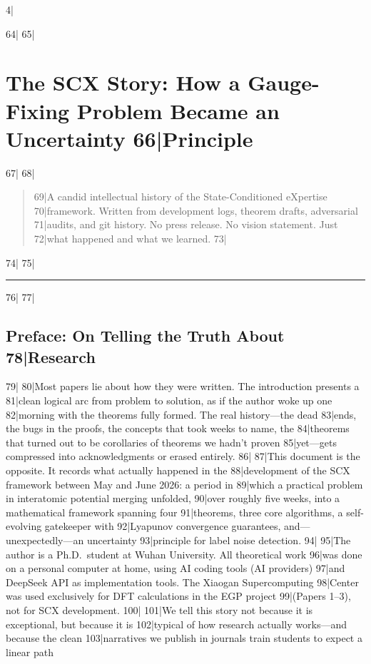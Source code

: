 4|\documentclass[
5|  12pt,
6|]{ctexart}
\begin{document}
64|
65|\section{The SCX Story: How a Gauge-Fixing Problem Became an Uncertainty
66|Principle}\label{the-scx-story-how-a-gauge-fixing-problem-became-an-uncertainty-principle}
67|
68|\begin{quote}
69|A candid intellectual history of the State-Conditioned eXpertise
70|framework. Written from development logs, theorem drafts, adversarial
71|audits, and git history. No press release. No vision statement. Just
72|what happened and what we learned.
73|\end{quote}
74|
75|\begin{center}\rule{0.5\linewidth}{0.5pt}\end{center}
76|
77|\subsection{Preface: On Telling the Truth About
78|Research}\label{preface-on-telling-the-truth-about-research}
79|
80|Most papers lie about how they were written. The introduction presents a
81|clean logical arc from problem to solution, as if the author woke up one
82|morning with the theorems fully formed. The real history---the dead
83|ends, the bugs in the proofs, the concepts that took weeks to name, the
84|theorems that turned out to be corollaries of theorems we hadn't proven
85|yet---gets compressed into acknowledgments or erased entirely.
86|
87|This document is the opposite. It records what actually happened in the
88|development of the SCX framework between May and June 2026: a period in
89|which a practical problem in interatomic potential merging unfolded,
90|over roughly five weeks, into a mathematical framework spanning four
91|theorems, three core algorithms, a self-evolving gatekeeper with
92|Lyapunov convergence guarantees, and---unexpectedly---an uncertainty
93|principle for label noise detection.
94|
95|The author is a Ph.D.~student at Wuhan University. All theoretical work
96|was done on a personal computer at home, using AI coding tools (AI providers)
97|and DeepSeek API as implementation tools. The Xiaogan Supercomputing
98|Center was used exclusively for DFT calculations in the EGP project
99|(Papers 1--3), not for SCX development.
100|
101|We tell this story not because it is exceptional, but because it is
102|typical of how research actually works---and because the clean
103|narratives we publish in journals train students to expect a linear path
\end{document}
